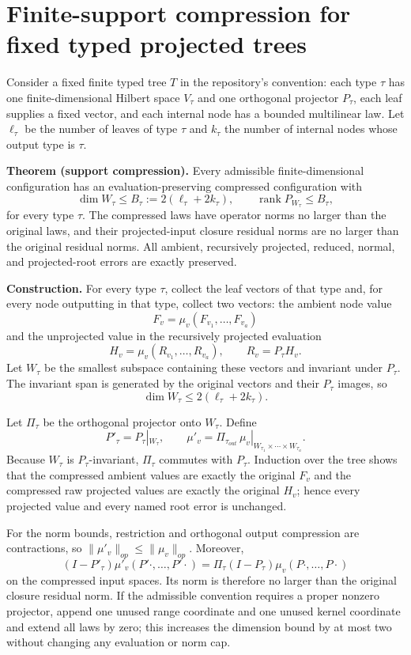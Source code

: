 \section*{Finite-support compression for fixed typed projected trees}
\label{sec:fixed-tree-support-compression}

Consider a fixed finite typed tree $T$ in the repository's convention: each
type $\tau$ has one finite-dimensional Hilbert space $V_\tau$ and one
orthogonal projector $P_\tau$, each leaf supplies a fixed vector, and each
internal node has a bounded multilinear law.  Let $\ell_\tau$ be the number
of leaves of type $\tau$ and $k_\tau$ the number of internal nodes whose
output type is $\tau$.

\textbf{Theorem (support compression).}  Every admissible finite-dimensional
configuration has an evaluation-preserving compressed configuration with
\[
  \dim W_\tau\le B_\tau:=2(\ell_\tau+2k_\tau),
  \qquad \operatorname{rank}P_{W_\tau}\le B_\tau,
\]
for every type $\tau$.  The compressed laws have operator norms no larger
than the original laws, and their projected-input closure residual norms are
no larger than the original residual norms.  All ambient, recursively
projected, reduced, normal, and projected-root errors are exactly preserved.

\textbf{Construction.}  For every type $\tau$, collect the leaf vectors of
that type and, for every node outputting in that type, collect two vectors:
the ambient node value
\[
  F_v=\mu_v(F_{v_1},\ldots,F_{v_a})
\]
and the unprojected value in the recursively projected evaluation
\[
  H_v=\mu_v(R_{v_1},\ldots,R_{v_a}),
  \qquad R_v=P_\tau H_v.
\]
Let $W_\tau$ be the smallest subspace containing these vectors and invariant
under $P_\tau$.  The invariant span is generated by the original vectors and
their $P_\tau$ images, so
\[
  \dim W_\tau\le2(\ell_\tau+2k_\tau).
\]

Let $\Pi_\tau$ be the orthogonal projector onto $W_\tau$.  Define
\[
  P'_\tau=P_\tau|_{W_\tau},
  \qquad
  \mu'_v=\Pi_{\tau_{out}}\,\mu_v|_{W_{\tau_1}\times\cdots\times W_{\tau_a}}.
\]
Because $W_\tau$ is $P_\tau$-invariant, $\Pi_\tau$ commutes with
$P_\tau$.  Induction over the tree shows that the compressed ambient values
are exactly the original $F_v$ and the compressed raw projected values are
exactly the original $H_v$; hence every projected value and every named root
error is unchanged.

For the norm bounds, restriction and orthogonal output compression are
contractions, so $\|\mu'_v\|_{op}\le\|\mu_v\|_{op}$.  Moreover,
\[
 (I-P'_\tau)\mu'_v(P'\cdot,\ldots,P'\cdot)
 =\Pi_\tau(I-P_\tau)\mu_v(P\cdot,\ldots,P\cdot)
\]
on the compressed input spaces.  Its norm is therefore no larger than the
original closure residual norm.  If the admissible convention requires a
proper nonzero projector, append one unused range coordinate and one unused
kernel coordinate and extend all laws by zero; this increases the dimension
bound by at most two without changing any evaluation or norm cap.

